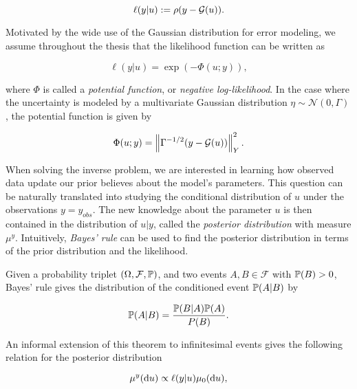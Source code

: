 \begin{equation}\label{def-ell}
  \ell(y|u) := \rho(y - \G(u)).
\end{equation}

Motivated by the wide use of the Gaussian distribution for error modeling, we assume throughout the thesis that the likelihood function can be written as

\begin{equation} \label{exponential-ell}
  \ell(y|u) = \exp(-\Phi(u;y)),
\end{equation}

where $\Phi$ is called a \textit{potential function}, or \textit{negative log-likelihood}. In the case where the uncertainty is modeled by a multivariate Gaussian distribution $\eta \sim \mathcal{N}(0, \Gamma)$, the potential function is given by

\begin{equation} \label{gaussian-potential}
  \Phi(u; y) = \norm{\Gamma^{-1/2}(y - \G(u))}_Y^2.
\end{equation}


When solving the inverse problem, we are interested in learning how observed data update our prior believes about the model's parameters. This question can be naturally translated into studying the conditional distribution of $u$ under the observations $y = y_{obs}$. The new knowledge about the parameter $u$ is then contained in the distribution of $u|y$, called the \textit{posterior distribution} with measure $\mu^y$. Intuitively, \textit{Bayes' rule} can be used to find the posterior distribution in terms of the prior distribution and the likelihood.

Given a probability triplet $(\Omega, \mathcal{F}, \P)$, and two events $A, B \in \mathcal{F}$ with $\P(B) > 0$, Bayes' rule gives the distribution of the conditioned event $\P(A|B)$ by

\begin{equation*}
  \P(A|B) = \frac{\P(B|A)\P(A)}{P(B)}.
\end{equation*}

An informal extension of this theorem to infinitesimal events gives the following relation for the posterior distribution

\begin{equation*}\label{bayes-rule}
  \mu^y(\text{d}u) \propto \ell(y|u)\mu_0(\d u),
\end{equation*}

